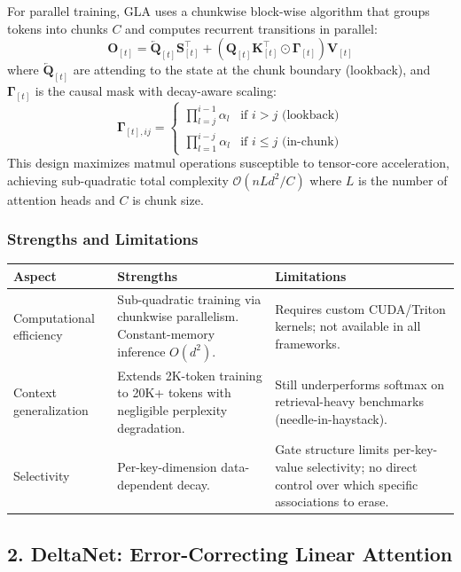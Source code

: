 \documentclass[11pt,a4paper]{article}
\begin{document}
For parallel training, GLA uses a chunkwise block-wise algorithm that groups tokens into chunks $C$ and computes recurrent transitions in parallel:
\[
\mathbf{O}_{[t]} = \overleftarrow{\mathbf{Q}}_{[t]} \mathbf{S}_{[t]}^\top + \left(\mathbf{Q}_{[t]} \mathbf{K}_{[t]}^\top \odot \mathbf{\Gamma}_{[t]}\right) \mathbf{V}_{[t]}
\]
where $\overleftarrow{\mathbf{Q}}_{[t]}$ are attending to the state at the chunk boundary (lookback), and $\mathbf{\Gamma}_{[t]}$ is the causal mask with decay-aware scaling:
\[
\mathbf{\Gamma}_{[t],ij} = \begin{cases} \prod_{l=j}^{i-1} \alpha_l & \text{if } i > j \text{ (lookback)} \\ \prod_{l=1}^{i-j} \alpha_l & \text{if } i \le j \text{ (in-chunk)} \end{cases}
\]
This design maximizes matmul operations susceptible to tensor-core acceleration, achieving sub-quadratic total complexity $\mathcal{O}(nLd^2/C)$ where $L$ is the number of attention heads and $C$ is chunk size.

\subsubsection{Strengths and Limitations}

\begin{table}[H]
\centering
\small
\begin{tabularx}{0.95\linewidth}{Xp{4cm}p{4cm}}
\toprule
\textbf{Aspect} & \textbf{Strengths} & \textbf{Limitations} \\
\midrule
Computational efficiency & Sub-quadratic training via chunkwise parallelism. Constant-memory inference $O(d^2)$. & Requires custom CUDA/Triton kernels; not available in all frameworks. \\
Context generalization & Extends 2K-token training to 20K+ tokens with negligible perplexity degradation. & Still underperforms softmax on retrieval-heavy benchmarks (needle-in-haystack). \\
Selectivity & Per-key-dimension data-dependent decay. & Gate structure limits per-key-value selectivity; no direct control over which specific associations to erase. \\
\bottomrule
\end{tabularx}
\end{table}

\subsection{2. DeltaNet: Error-Correcting Linear Attention}
\end{document}
